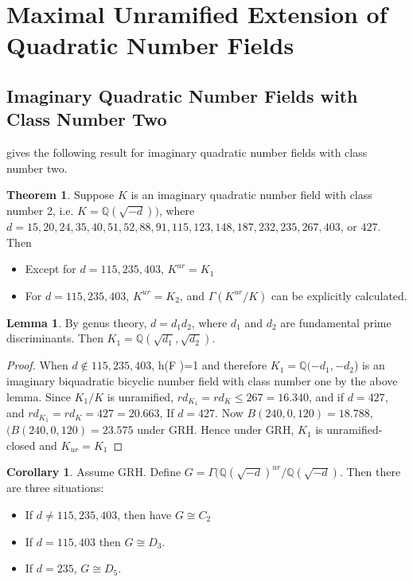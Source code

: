 \documentclass[12pt]{extarticle}
\newcommand{\Q}{\mathbb{Q}}
\newcommand{\<}{\langle}
\renewcommand{\>}{\rangle}
\theoremstyle{definition}
\newtheorem{theorem}{Theorem}
\newtheorem{corollary}{Corollary}
\newtheorem{lemma}{Lemma}
\begin{document}
\section{Maximal Unramified Extension of Quadratic Number Fields}
\subsection{Imaginary Quadratic Number Fields with Class Number Two}
\cite{YAMAMURA1996} gives the following result for imaginary quadratic number fields with class number two.
\begin{theorem}
Suppose $K$ is an imaginary quadratic number field with class number 2, i.e. $K=\Q(\sqrt{-d}))$, where $d= 15, 20, 24, 35, 40, 51, 52, 88, 91, 115, 123, 148, 187, 232, 235, 267, 403$, or $427$. Then \begin{itemize}
\item Except for $d = 115, 235, 403$, $K^{ur} = K_1$
\item For $d = 115, 235, 403$,  $K^{ur} = K_2$, and $\Gamma(K^{ur}/K)$ can be explicitly calculated. 
\end{itemize}
\end{theorem}
\begin{lemma}
By genus theory, $d= d_1d_2$, where $d_1$ and $d_2$ are fundamental prime discriminants. Then $K_1 = \Q(\sqrt{d_1},\sqrt{d_2})$. 
\end{lemma}
\begin{proof}
When $d \not \in {115, 235, 403}$, h(F )=1 and therefore 
$K_1 =\Q(- d_1, - d_2 $) is an imaginary biquadratic bicyclic number field with class number one by the above lemma. Since $K_1/K$ is unramified,  $rd_{K_1}=rd_K \leq 267=16.340$, and  if $d = 427$, and $rd_{K_1}=rd_K = 427=20.663$, If $d=427$. Now  $B(240, 0, 120) = 18.788$, $(B(240, 0, 120) = 23.575$ under GRH. Hence under GRH, $K_1$ is unramified-closed and $K_{ur}=K_1$ 
\end{proof}
\begin{corollary}
Assume GRH. Define $G = \Gamma(\Q(\sqrt{-d})^{ur}/\Q(\sqrt{-d})$. Then there are three situations:
\begin{itemize}
\item If $d \neq 115, 235, 403$, then have $ G \cong C_2$
\item If $d = 115,403$ then $G \cong D_3$.
\item If $d =  235$, $G \cong D_5$. 
\end{itemize}
\end{corollary}
\end{document}
